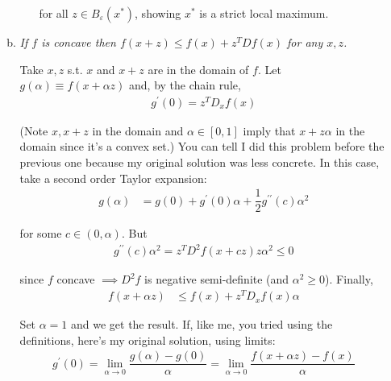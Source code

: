 \documentclass{article}
\begin{document}
\begin{enumerate}[1.]
\begin{enumerate}[a)]
\begin{enumerate}[i)]
            for all $z \in B_{\varepsilon}(x^*)$, showing $x^{*}$ is a strict local maximum.
        \end{enumerate}

      \item \textit{If $f$ is concave then $f(x + z) \le f(x) + z^T Df(x)$ for any $x, z$.}

        \solution Take $x, z$ s.t. $x$ and $x + z$ are in the domain of $f$. Let $g(\alpha) \equiv f(x + \alpha z)$ and, by the chain rule,
          \begin{align*}
            g^\prime(0)
            =
            z^T D_x f(x)
          \end{align*}

          (Note $x, x + z$ in the domain and $\alpha \in [0, 1]$ imply that $x + z\alpha$ in the domain since it's a convex set.) You can tell I did this problem before the previous one because my original solution was less concrete. In this case, take a second order Taylor expansion:
          \begin{align*}
            g(\alpha)
            &
            =
            g(0)
            +
            g^{\prime}(0) \alpha
            +
            \dfrac{1}{2}
            g^{\prime\prime}(c) \alpha^2
          \end{align*}

          for some $c \in (0, \alpha)$. But
          \begin{align*}
            g^{\prime\prime}(c) \alpha^2
            =
            z^T D^2 f(x + cz) z \alpha^2 \le 0
          \end{align*}

          since $f$ concave $\implies D^2f$ is negative semi-definite (and $\alpha^2 \ge 0$). Finally,
          \begin{align*}
            f(x + \alpha z)
            &
            \le
            f(x)
            +
            z^T D_x f(x) \alpha
          \end{align*}

          Set $\alpha = 1$ and  we get the result. If, like me, you tried using the definitions, here's my original solution, using limits:
          \begin{align*}
            g^\prime(0)
            =
            \lim_{\alpha \to 0}
            \dfrac{g(\alpha) - g(0)}{\alpha}
            =
            \lim_{\alpha \to 0}
            \dfrac{f(x + \alpha z) - f(x)}{\alpha}
          \end{align*}



\end{enumerate}
\end{enumerate}
\end{document}
